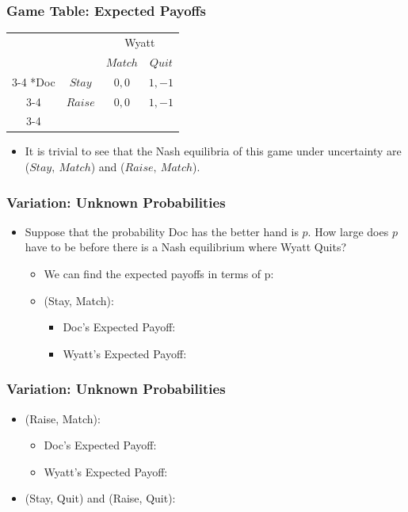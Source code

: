 \begin{frame}
\frametitle{Game Table: Expected Payoffs}
\begin{table}[h]
\centering
 
\begin{tabular}{cc|c|c|}
& \multicolumn{1}{c}{} & \multicolumn{2}{c}{Wyatt}\\
& \multicolumn{1}{c}{} & \multicolumn{1}{c}{$Match$}  & \multicolumn{1}{c}{$Quit$} \\\cline{3-4}
\multirow{2}*{Doc}  & $Stay$ & $0, 0$ & $1, -1$ \\\cline{3-4}
& $Raise$ & $0, 0$ & $1,-1$ \\\cline{3-4}
\end{tabular}
\end{table}
\begin{itemize}
\item It is trivial to see that the Nash equilibria of this game under uncertainty are ($Stay,~Match$) and ($Raise,~Match$).
\end{itemize}
\end{frame}



\begin{frame}
\frametitle{Variation: Unknown Probabilities}
\begin{itemize}
\item Suppose that the probability Doc has the better hand is $p$. 
  How large does $p$ have to be before there is a Nash equilibrium where Wyatt Quits?
\begin{itemize}
	\item We can find the expected payoffs in terms of p:
	\item (Stay, Match):
	\begin{itemize}
		\item Doc's Expected Payoff:
    \vspace{10mm}
		\item Wyatt's Expected Payoff:
    \vspace{10mm}
	\end{itemize}
\end{itemize}
\end{itemize}
\end{frame}


\begin{frame}
\frametitle{Variation: Unknown Probabilities}
\begin{itemize}
	\item (Raise, Match):
	\begin{itemize}
		\item Doc's Expected Payoff:
    \vspace{10mm}
		\item Wyatt's Expected Payoff:
    \vspace{10mm}
	\end{itemize}
	\item (Stay, Quit) and (Raise, Quit):
  \vspace{10mm}
\end{itemize}
\end{frame}

